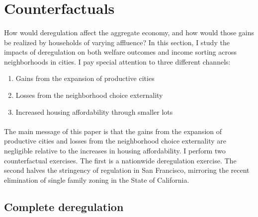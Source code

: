 \documentclass[12pt]{article}
\begin{document}
\section{Counterfactuals}\label{Section:Counterfactuals}
\paragraph{}
How would deregulation affect the aggregate economy, and how would those gains be realized by households of varying affluence? In this section, I study the impacts of deregulation on both welfare outcomes and income sorting across neighborhoods in cities. I pay special attention to three different channels:

\begin{enumerate}
	\item Gains from the expansion of productive cities \citep{hseihmoretti, durantonpugaurbgrowth}
	
	\item Losses from the neighborhood choice externality \citep{hamilton1976, calabresetal}
	
	\item Increased housing affordability through smaller lots \citep{Song, kulka}
\end{enumerate}

\paragraph*{}
The main message of this paper is that the gains from the expansion of productive cities and losses from the neighborhood choice externality are negligible relative to the increases in housing affordability. I perform two counterfactual exercises. The first is a nationwide deregulation exercise. The second halves the stringency of regulation in San Francisco, mirroring the recent elimination of single family zoning in the State of California. 

\subsection{Complete deregulation}
\end{document}

